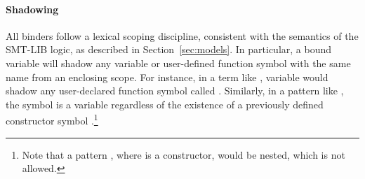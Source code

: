 
\paragraph{Shadowing}
All binders follow a lexical scoping discipline, 
consistent with the semantics of the SMT-LIB logic,
as described in Section~\ref{sec:models}.
In particular, a bound variable will shadow any variable or user-defined 
function symbol with the same name from an enclosing scope.
For instance, in a term like
,
variable  would shadow any user-declared function symbol
called .
Similarly, in a  pattern like ,
the symbol  is a variable regardless of the existence 
of a previously defined constructor symbol .\footnote{%
Note that a pattern , where  is a constructor,
would be nested, which is not allowed. 
}

